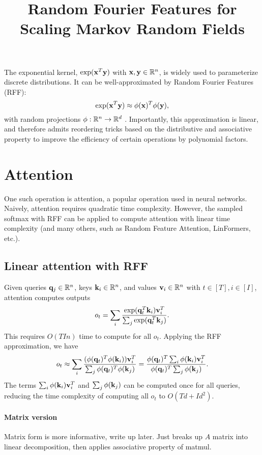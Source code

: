 \documentclass{article}
\title{Random Fourier Features for Scaling Markov Random Fields}
\begin{document}
\maketitle

The exponential kernel, $\exp(\mathbf{x}^T\mathbf{y})$ with $\mathbf{x},\mathbf{y}\in\mathbb{R}^n$,
is widely used to parameterize discrete distributions.
It can be well-approximated by Random Fourier Features
(RFF):
\begin{equation}
\exp(\mathbf{x}^T\mathbf{y})\approx \phi(\mathbf{x})^T\phi(\mathbf{y}),
\end{equation}
with random projections $\phi:\mathbb{R}^n\to\mathbb{R}^d$ \citep{rawat2019linearizedsoftmax}.
Importantly, this approximation is linear, and therefore admits
reordering tricks based on the distributive and associative property
to improve the efficiency of certain operations by polynomial factors.

\section{Attention}
One such operation is attention, a popular operation used in neural networks.
Naively, attention requires quadratic time complexity.
However, the sampled softmax with RFF \citep{rawat2019linearizedsoftmax}
can be applied to compute attention with linear time complexity
\citep{choromanski2020rethinking}
(and many others, such as Random Feature Attention, LinFormers, etc.).

\subsection{Linear attention with RFF}
Given queries $\mathbf{q}_j\in\mathbb{R}^n$, keys $\mathbf{k}_i\in\mathbb{R}^n$, and values $\mathbf{v}_i\in\mathbb{R}^n$ with $t\in[T],i\in[I]$,
attention computes outputs
\begin{equation}
o_t = \sum_i \frac{\exp(\mathbf{q}_t^T\mathbf{k}_i)\mathbf{v}_i^T}{\sum_j \exp(\mathbf{q}_t^T\mathbf{k}_j)}.
\end{equation}
This requires $O(TIn)$ time to compute for all $o_t$.
Applying the RFF approximation, we have
\begin{equation}
o_t \approx \sum_i \frac{(\phi(\mathbf{q}_t)^T\phi(\mathbf{k}_i))\mathbf{v}_i^T}{\sum_j\phi(\mathbf{q}_t)^T\phi(\mathbf{k}_j)}
= \frac{\phi(\mathbf{q}_t)^T\sum_i\phi(\mathbf{k}_i)\mathbf{v}_i^T}{\phi(\mathbf{q}_t)^T\sum_j\phi(\mathbf{k}_j)}.
\end{equation}
The terms $\sum_i\phi(\mathbf{k}_i)\mathbf{v}_i^T$ and $\sum_j\phi(\mathbf{k}_j)$ can be computed once for all queries,
reducing the time complexity of computing all $o_t$ to $O(Td+Id^2)$.

\paragraph{Matrix version}
Matrix form \citep{choromanski2020rethinking} is more informative, write up later.
Just breaks up $A$ matrix into linear decomposition,
then applies associative property of matmul.
\end{document}
